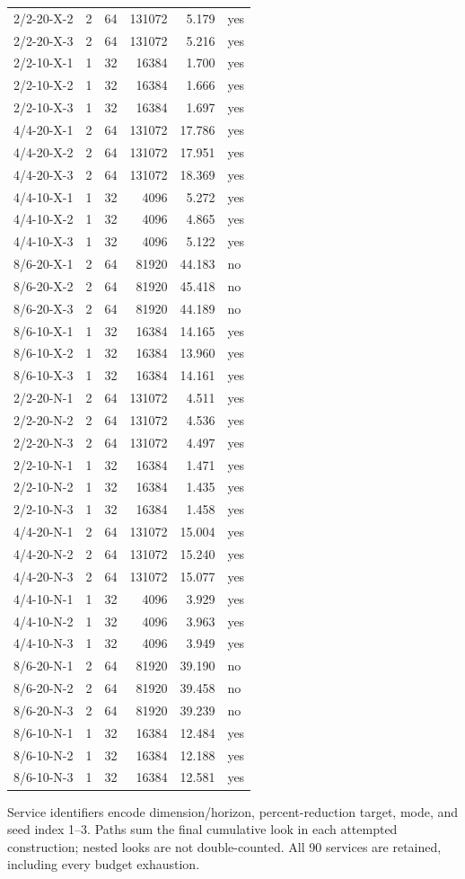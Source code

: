 \begin{longtable}{lrrrrl}
2/2-20-X-2 & 2 & 64 & 131072 & 5.179 & yes \\
2/2-20-X-3 & 2 & 64 & 131072 & 5.216 & yes \\
2/2-10-X-1 & 1 & 32 & 16384 & 1.700 & yes \\
2/2-10-X-2 & 1 & 32 & 16384 & 1.666 & yes \\
2/2-10-X-3 & 1 & 32 & 16384 & 1.697 & yes \\
4/4-20-X-1 & 2 & 64 & 131072 & 17.786 & yes \\
4/4-20-X-2 & 2 & 64 & 131072 & 17.951 & yes \\
4/4-20-X-3 & 2 & 64 & 131072 & 18.369 & yes \\
4/4-10-X-1 & 1 & 32 & 4096 & 5.272 & yes \\
4/4-10-X-2 & 1 & 32 & 4096 & 4.865 & yes \\
4/4-10-X-3 & 1 & 32 & 4096 & 5.122 & yes \\
8/6-20-X-1 & 2 & 64 & 81920 & 44.183 & no \\
8/6-20-X-2 & 2 & 64 & 81920 & 45.418 & no \\
8/6-20-X-3 & 2 & 64 & 81920 & 44.189 & no \\
8/6-10-X-1 & 1 & 32 & 16384 & 14.165 & yes \\
8/6-10-X-2 & 1 & 32 & 16384 & 13.960 & yes \\
8/6-10-X-3 & 1 & 32 & 16384 & 14.161 & yes \\
2/2-20-N-1 & 2 & 64 & 131072 & 4.511 & yes \\
2/2-20-N-2 & 2 & 64 & 131072 & 4.536 & yes \\
2/2-20-N-3 & 2 & 64 & 131072 & 4.497 & yes \\
2/2-10-N-1 & 1 & 32 & 16384 & 1.471 & yes \\
2/2-10-N-2 & 1 & 32 & 16384 & 1.435 & yes \\
2/2-10-N-3 & 1 & 32 & 16384 & 1.458 & yes \\
4/4-20-N-1 & 2 & 64 & 131072 & 15.004 & yes \\
4/4-20-N-2 & 2 & 64 & 131072 & 15.240 & yes \\
4/4-20-N-3 & 2 & 64 & 131072 & 15.077 & yes \\
4/4-10-N-1 & 1 & 32 & 4096 & 3.929 & yes \\
4/4-10-N-2 & 1 & 32 & 4096 & 3.963 & yes \\
4/4-10-N-3 & 1 & 32 & 4096 & 3.949 & yes \\
8/6-20-N-1 & 2 & 64 & 81920 & 39.190 & no \\
8/6-20-N-2 & 2 & 64 & 81920 & 39.458 & no \\
8/6-20-N-3 & 2 & 64 & 81920 & 39.239 & no \\
8/6-10-N-1 & 1 & 32 & 16384 & 12.484 & yes \\
8/6-10-N-2 & 1 & 32 & 16384 & 12.188 & yes \\
8/6-10-N-3 & 1 & 32 & 16384 & 12.581 & yes \\
\end{longtable}
\endgroup
{\footnotesize Service identifiers encode dimension/horizon, percent-reduction target, mode, and seed index 1--3. Paths sum the final cumulative look in each attempted construction; nested looks are not double-counted. All 90 services are retained, including every budget exhaustion.}
